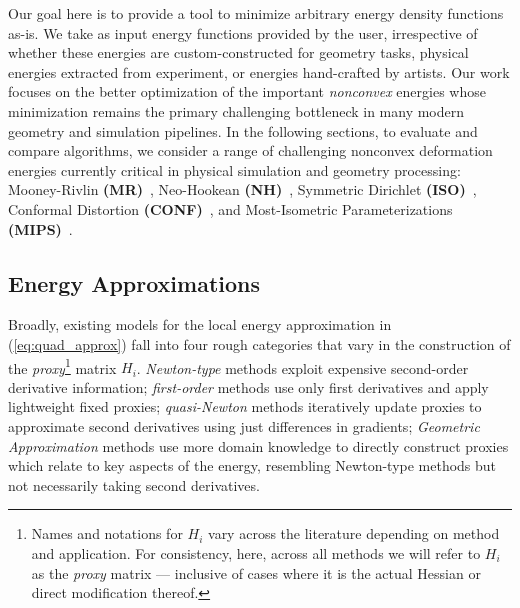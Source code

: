Our goal here is to provide a tool to minimize arbitrary energy
density functions as-is. We take as input energy functions provided
by the user, irrespective of whether these energies are custom-constructed
for geometry tasks, physical energies extracted from experiment,
or energies hand-crafted by artists. Our work focuses on the better
optimization of the important \emph{nonconvex} energies whose
minimization remains the primary challenging bottleneck in many
modern geometry and simulation pipelines.  In the following sections,
to evaluate and compare algorithms, we consider a range of challenging
nonconvex deformation energies currently critical in physical
simulation and geometry processing: Mooney-Rivlin
{\bf(MR)}~\cite{Bower:2009:AMO}, Neo-Hookean
{\bf(NH)}~\cite{Bower:2009:AMO},  Symmetric Dirichlet
{\bf(ISO)}~\cite{Smith:2015:BPW}, Conformal Distortion
{\bf(CONF)}~\cite{Aigerman:2015:Seamless}, and Most-Isometric
Parameterizations {\bf(MIPS)}~\cite{Hormann:2000:MIPS}.

\subsection{Energy Approximations} 

Broadly, existing models for the local energy approximation in (\ref{eq:quad_approx}) fall into four rough categories
that vary in the construction of the \emph{proxy}\footnote{Names and notations for $H_i$ vary across the literature
depending on method and application. For consistency, here, across all
methods we will refer to $H_i$ as the \emph{proxy} matrix --- inclusive of cases where it is the actual Hessian
or direct modification thereof.} matrix $H_i$.
\emph{Newton-type} methods exploit expensive
second-order derivative information;
\emph{first-order} methods use only first derivatives and
apply lightweight fixed proxies;
\emph{quasi-Newton} methods iteratively update proxies to approximate
second derivatives using just differences in gradients;
\emph{Geometric Approximation} methods use
more domain knowledge to directly construct proxies which relate to 
key aspects of the energy, resembling Newton-type methods but
not necessarily taking second derivatives.

